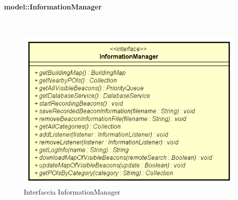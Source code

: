 \documentclass[../DefinizioneDiProdotto.tex]{subfiles}
\begin{document}
\paragraph{model::InformationManager}
\
\begin{figure}[H]
	\centering
	\includegraphics[width=\maxwidth]{img/InformationManager.png}
	\caption{Interfaccia InformationManager}\label{fig:model::InformationManager} 
\end{figure}
\end{document}
